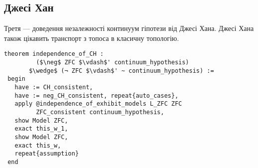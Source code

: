 \subsection*{Джесі Хан}

Третя --- доведення незалежності континуум гіпотези від Джесі Хана.
Джесі Хана також цікавить транспорт з топоса в класичну топологію.

\begin{lstlisting}[mathescape=true]
 theorem independence_of_CH :
         ($\neg$ ZFC $\vdash$' continuum_hypothesis)
       $\wedge$ (¬ ZFC $\vdash$' ~ continuum_hypothesis) :=
 begin
   have := CH_consistent,
   have := neg_CH_consistent, repeat{auto_cases},
   apply @independence_of_exhibit_models L_ZFC ZFC
         ZFC_consistent continuum_hypothesis,
   show Model ZFC,
   exact this_w_1,
   show Model ZFC,
   exact this_w,
   repeat{assumption}
 end
\end{lstlisting}

